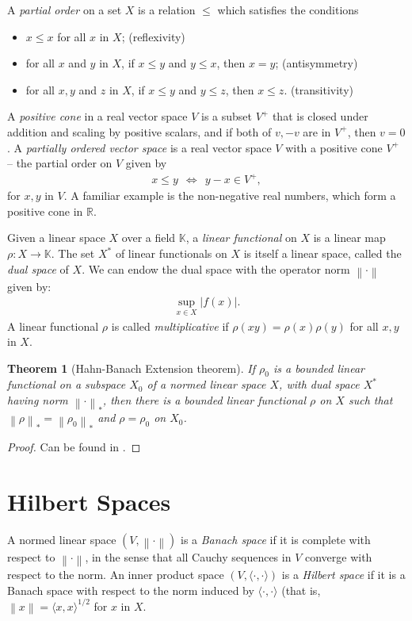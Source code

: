 \documentclass[11pt,a4paper]{report}
\theoremstyle{plain}
\newtheorem*{thm*}{Theorem}
\theoremstyle{definition}
\newcommand{\1}{\mathbbm{1}}
\newcommand{\R}{\mathbb{R}}
\begin{document}
A \emph{partial order} on a set $X$ is a relation $\leq$ which satisfies the 
conditions
\begin{itemize}
	\item $x \leq x$ for all $x$ in $X$; 		\hfill (reflexivity)
	\item for all $x$ and $y$ in $X$, if $x \leq y$ and $y\leq x$, then $x=y$; 
												\hfill (antisymmetry)
	\item for all $x,y$ and $z$ in $X$, if $x \leq y$ and $y\leq z$, then $x\leq z$. 
												\hfill (transitivity)
\end{itemize}

A \emph{positive cone} in a real vector space $V$ is a subset $V^+$ that is 
closed under addition and scaling by positive scalars, and if both of $v,-v$ are in 
$V^+$, then $v=0$. A \emph{partially ordered vector space} is a real vector 
space $V$ with a positive cone $V^+$ -- the partial order on $V$ given by
\begin{align*}
	x\leq y ~~\iff~~ y-x \in V^+,
\end{align*}
for $x,y$ in $V$.
A familiar example is the non-negative real numbers, which form a positive cone in $\R$.


Given a linear space $X$ over a field $\mathbb K$, a \emph{linear functional} on 
$X$ is a linear map $\rho:X\to\mathbb K$. The set $X^\ast$ of linear functionals 
on $X$ is itself a linear space, called the \emph{dual space} of $X$. We can 
endow the dual space with the operator norm $\left\|\cdot\right\|$ given by:
\begin{align*}
	\sup_{x\in X} \left|f(x)\right|.
\end{align*}
A linear functional $\rho$ is called \emph{multiplicative} if $\rho(xy) = 
\rho(x)\rho(y)$ for all $x,y$ in $X$. 


\begin{thm*}[Hahn-Banach Extension theorem] 
	If $\rho_0$ is a bounded linear functional on a subspace $X_0$ of a normed 
	linear space $X$, with dual space $X^\ast$ having norm $\left\|\cdot\right\|_\ast$, 
	then there is a bounded linear functional $\rho$ on $X$ such that 
 	$\left\|\rho\right\|_\ast=\left\|\rho_0\right\|_\ast$ and $\rho=\rho_0$ on $X_0$.
\end{thm*}
\begin{proof}
	Can be found in \cite[Theorem 1.6.1, p.~44]{kadison83}.
\end{proof}

\section{Hilbert Spaces}\label{section:hscons}
A normed linear space $(V,\left\|\cdot\right\|)$ is a \emph{Banach space} if it 
is complete with respect to $\left\|\cdot\right\|$, in the sense that all Cauchy 
sequences in $V$ converge with respect to the norm. An inner product space 
$(V,\langle\cdot,\cdot\rangle)$ is a \emph{Hilbert space} if it is a Banach 
space with respect to the norm induced by $\langle\cdot,\cdot\rangle$ (that is,
$\left\|x\right\| = \langle x,x\rangle^{1/2}$ for $x$ in $X$.
\end{document}
